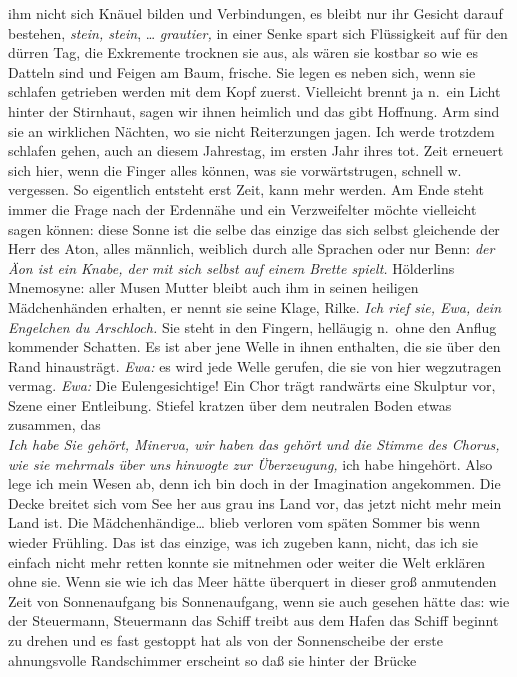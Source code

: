 \documentclass[
]{article}
\begin{document}
ihm nicht sich Knäuel bilden und Verbindungen, es bleibt nur ihr Gesicht
darauf bestehen, \emph{stein, stein}, \ldots{} \emph{grautier,} in einer
Senke spart sich Flüssigkeit auf für den dürren Tag, die Exkremente
trocknen sie aus, als wären sie kostbar so wie es Datteln sind und
Feigen am Baum, frische. Sie legen es neben sich, wenn sie schlafen
getrieben werden mit dem Kopf zuerst. Vielleicht brennt ja n.~ein Licht
hinter der Stirnhaut, sagen wir ihnen heimlich und das gibt Hoffnung.
Arm sind sie an wirklichen Nächten, wo sie nicht Reiterzungen jagen. Ich
werde trotzdem schlafen gehen, auch an diesem Jahrestag, im ersten Jahr
ihres tot. Zeit erneuert sich hier, wenn die Finger alles können, was
sie vorwärtstrugen, schnell w. vergessen. So eigentlich entsteht erst
Zeit, kann mehr werden. Am Ende steht immer die Frage nach der Erdennähe
und ein Verzweifelter möchte vielleicht sagen können: diese Sonne ist
die selbe das einzige das sich selbst gleichende der Herr des Aton,
alles männlich, weiblich durch alle Sprachen oder nur Benn: \emph{der
Äon ist ein Knabe, der mit sich selbst auf einem Brette spielt.}
Hölderlins Mnemosyne: aller Musen Mutter bleibt auch ihm in seinen
heiligen Mädchenhänden erhalten, er nennt sie seine Klage, Rilke.
\emph{Ich rief sie, Ewa, dein Engelchen du Arschloch.} Sie steht in den
Fingern, helläugig n.~ohne den Anflug kommender Schatten. Es ist aber
jene Welle in ihnen enthalten, die sie über den Rand hinausträgt.
\emph{Ewa:} es wird jede Welle gerufen, die sie von hier wegzutragen
vermag. \emph{Ewa:} Die Eulengesichtige! Ein Chor trägt randwärts eine
Skulptur vor, Szene einer Entleibung. Stiefel kratzen über dem neutralen
Boden etwas zusammen, das\\
\emph{Ich habe Sie gehört, Minerva, wir haben das gehört und die Stimme
des Chorus, wie sie mehrmals über uns hinwogte zur Überzeugung, }ich
habe hingehört. Also lege ich mein Wesen ab, denn ich bin doch in der
Imagination angekommen. Die Decke breitet sich vom See her aus grau ins
Land vor, das jetzt nicht mehr mein Land ist. Die Mädchenhändige\ldots{}
blieb verloren vom späten Sommer bis wenn wieder Frühling. Das ist das
einzige, was ich zugeben kann, nicht, das ich sie einfach nicht mehr
retten konnte sie mitnehmen oder weiter die Welt erklären ohne sie. Wenn
sie wie ich das Meer hätte überquert in dieser groß anmutenden Zeit von
Sonnenaufgang bis Sonnenaufgang, wenn sie auch gesehen hätte das: wie
der Steuermann, Steuermann das Schiff treibt aus dem Hafen das Schiff
beginnt zu drehen und es fast gestoppt hat als von der Sonnenscheibe der
erste ahnungsvolle Randschimmer erscheint so daß sie hinter der Brücke
\end{document}
